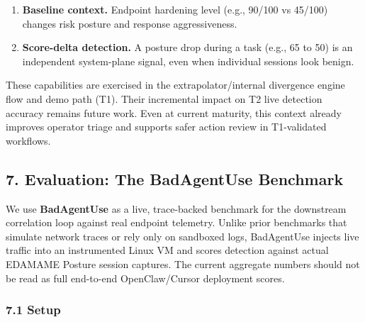 \documentclass[
]{article}
\begin{document}
\begin{enumerate}
\def\labelenumi{\arabic{enumi}.}
\item
  \textbf{Baseline context.} Endpoint hardening level (e.g., 90/100 vs
  45/100) changes risk posture and response aggressiveness.
\item
  \textbf{Score-delta detection.} A posture drop during a task (e.g., 65
  to 50) is an independent system-plane signal, even when individual
  sessions look benign.
\end{enumerate}

These capabilities are exercised in the extrapolator/internal divergence
engine flow and demo path (T1). Their incremental impact on T2 live
detection accuracy remains future work. Even at current maturity, this
context already improves operator triage and supports safer action
review in T1-validated workflows.

\subsection{7. Evaluation: The BadAgentUse
Benchmark}\label{evaluation-the-badagentuse-benchmark}

We use \textbf{BadAgentUse} as a live, trace-backed benchmark for the
downstream correlation loop against real endpoint telemetry. Unlike
prior benchmarks that simulate network traces or rely only on sandboxed
logs, BadAgentUse injects live traffic into an instrumented Linux VM and
scores detection against actual EDAMAME Posture session captures. The
current aggregate numbers should not be read as full end-to-end
OpenClaw/Cursor deployment scores.

\subsubsection{7.1 Setup}\label{setup}
\end{document}
